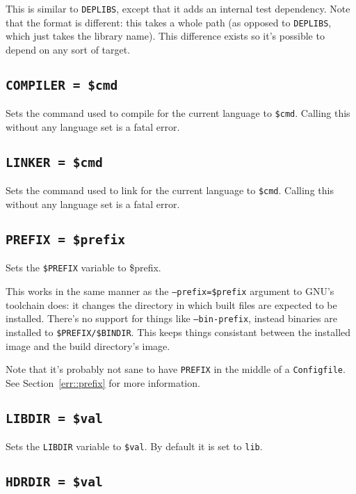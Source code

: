 \documentclass{article}
\begin{document}
This is similar to \texttt{DEPLIBS}, except that it adds an internal
test dependency.  Note that the format is different: this takes a
whole path (as opposed to \texttt{DEPLIBS}, which just takes the
library name).  This difference exists so it's possible to depend on
any sort of target.

\subsection{\texttt{COMPILER = \$cmd}}

Sets the command used to compile for the current language to
\texttt{\$cmd}.  Calling this without any language set is a fatal
error.

\subsection{\texttt{LINKER = \$cmd}}

Sets the command used to link for the current language to
\texttt{\$cmd}.  Calling this without any language set is a fatal
error.

\subsection{\texttt{PREFIX = \$prefix}}

Sets the \texttt{\$PREFIX} variable to \$prefix.

This works in the same manner as the \texttt{--prefix=\$prefix}
argument to GNU's toolchain does: it changes the directory in which
built files are expected to be installed.  There's no support for
things like \texttt{--bin-prefix}, instead binaries are installed to
\texttt{\$PREFIX/\$BINDIR}.  This keeps things consistant between the
installed image and the build directory's image.

Note that it's probably not sane to have \texttt{PREFIX} in the middle
of a \texttt{Configfile}.  See Section~\ref{err::prefix} for more
information.

\subsection{\texttt{LIBDIR = \$val}}

Sets the \texttt{LIBDIR} variable to \texttt{\$val}.  By default it is
set to \texttt{lib}.

\subsection{\texttt{HDRDIR = \$val}}
\end{document}
